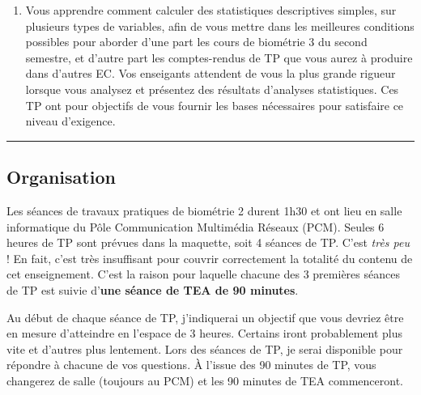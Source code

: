 \documentclass[a4paperpaper,]{article}
\providecommand{\tightlist}{%
  \setlength{\itemsep}{0pt}\setlength{\parskip}{0pt}}
\begin{document}
\begin{enumerate}
\def\labelenumi{\arabic{enumi}.}
\setcounter{enumi}{2}
\tightlist
\item
  Vous apprendre comment calculer des statistiques descriptives simples, sur plusieurs types de variables, afin de vous mettre dans les meilleures conditions possibles pour aborder d'une part les cours de biométrie 3 du second semestre, et d'autre part les comptes-rendus de TP que vous aurez à produire dans d'autres EC. Vos enseigants attendent de vous la plus grande rigueur lorsque vous analysez et présentez des résultats d'analyses statistiques. Ces TP ont pour objectifs de vous fournir les bases nécessaires pour satisfaire ce niveau d'exigence.
\end{enumerate}

\begin{center}\rule{0.5\linewidth}{\linethickness}\end{center}

\hypertarget{organisation}{%
\subsection{Organisation}\label{organisation}}

Les séances de travaux pratiques de biométrie 2 durent 1h30 et ont lieu en salle informatique du Pôle Communication Multimédia Réseaux (PCM). Seules 6 heures de TP sont prévues dans la maquette, soit 4 séances de TP. C'est \emph{très peu} ! En fait, c'est très insuffisant pour couvrir correctement la totalité du contenu de cet enseignement. C'est la raison pour laquelle chacune des 3 premières séances de TP est suivie d'\textbf{une séance de TEA de 90 minutes}.

Au début de chaque séance de TP, j'indiquerai un objectif que vous devriez être en mesure d'atteindre en l'espace de 3 heures. Certains iront probablement plus vite et d'autres plus lentement. Lors des séances de TP, je serai disponible pour répondre à chacune de vos questions. À l'issue des 90 minutes de TP, vous changerez de salle (toujours au PCM) et les 90 minutes de TEA commenceront.
\end{document}

